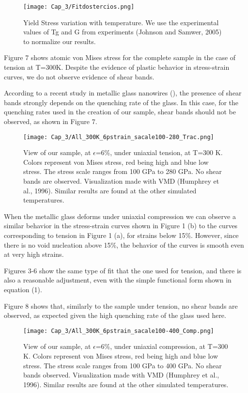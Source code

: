 \begin{figure}[htp]
\centering
\texttt{[image: Cap\_3/Fitdostercios.png]}
\caption{Yield Stress variation with temperature. We use the experimental values of Tg and G from experiments (Johnson and Samwer, 2005) to normalize our results.}
\label{C3:fg:fitDosTercios}
\end{figure}

Figure 7 shows atomic von Mises stress for the complete sample in the case of tension at T=300K. Despite the evidence of plastic behavior in stress-strain curves, we do not observe evidence of shear bands.

According to a recent study in metallic glass nanowires (\cite{xiao12}), the presence of shear bands strongly depends on the quenching rate of the glass. In this case, for the quenching rates used in the creation of our sample, shear bands should not be observed, as shown in Figure 7.

\begin{figure}[htp]
\centering
\texttt{[image: Cap\_3/All\_300K\_6pstrain\_sacale100-280\_Trac.png]}
\caption{View of our  sample, at $\epsilon$=6\%, under uniaxial tension, at T=300 K. Colors represent von Mises stress, red being high and blue low stress. The stress scale ranges from 100 GPa to 280 GPa. No shear bands are observed. Visualization made with VMD (Humphrey et al., 1996). Similar results are found at the other simulated temperatures.}
\label{C3:fg:sampleTen}
\end{figure}

When the metallic glass deforms under uniaxial compression we can observe a similar behavior in the stress-strain curves shown in Figure 1 (b) to the curves corresponding to tension in Figure 1 (a), for strains below 15\%. However, since there is no void nucleation above 15\%, the behavior of the curves is smooth even at very high strains.

Figures 3-6 show the same type of fit that the one used for tension, and there is also a reasonable adjustment, even with the simple functional form shown in equation (1).

Figure 8 shows that, similarly to the sample under tension, no shear bands are observed, as expected given the high quenching rate of the glass used here.

\begin{figure}[htp]
\centering
\texttt{[image: Cap\_3/All\_300K\_6pstrain\_sacale100-400\_Comp.png]}
\caption{View of our sample, at $\epsilon$=6\%, under uniaxial compression, at T=300 K. Colors represent von Mises stress, red being high and blue low stress. The stress scale ranges from 100 GPa to 400 GPa. No shear bands observed. Visualization made with VMD (Humphrey et al., 1996). Similar results are found at the other simulated temperatures.}
\label{C3:fg:sampleComp}
\end{figure}


